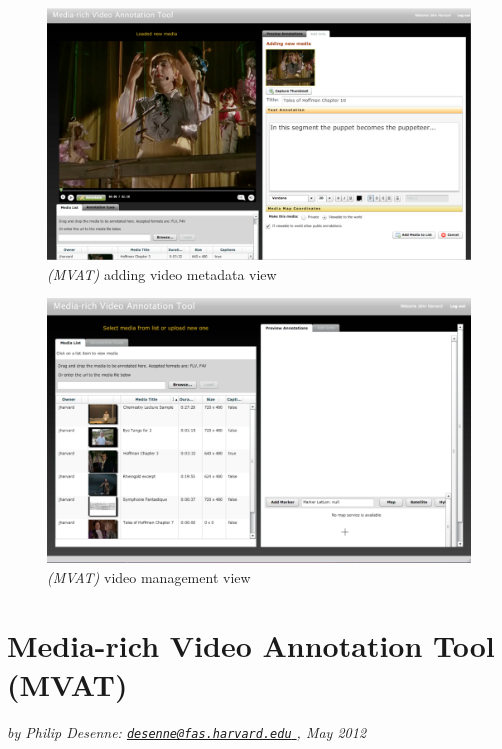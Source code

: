 \begin{figure}[!ht]
	\includegraphics[width=\textwidth]{gfx/mvat/mvat-loading-video-adding-metadata.png}
	\caption{\textit{(MVAT)} adding video metadata view} 
	\label{fig:mvat:adding-video-metadata}
\end{figure} 

\begin{figure}[!ht]
	\includegraphics[width=\textwidth]{gfx/mvat/mvat-video-management}
	\caption{\textit{(MVAT)} video management view} 
	\label{fig:mvat:video-management-view}
\end{figure}

\section{Media-rich Video Annotation Tool (MVAT)}
\label{sec:priorwork:media-rich-video-annotation-tool}

\textit{by Philip Desenne: \href{mailto:desenne@fas.harvard.edu}{\nolinkurl{desenne@fas.harvard.edu} }, May 2012}

